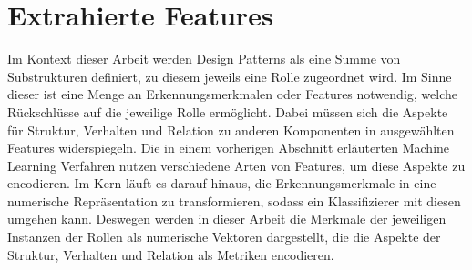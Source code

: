 \section{Extrahierte Features}

Im Kontext dieser Arbeit werden Design Patterns als eine Summe von Substrukturen definiert, zu diesem jeweils eine Rolle zugeordnet wird.
Im Sinne dieser ist eine Menge an Erkennungsmerkmalen oder Features notwendig, welche Rückschlüsse auf die jeweilige Rolle ermöglicht. 
Dabei müssen sich die Aspekte für Struktur, Verhalten und Relation zu anderen Komponenten in ausgewählten Features widerspiegeln.
Die in einem vorherigen Abschnitt erläuterten Machine Learning Verfahren nutzen verschiedene Arten von Features, um diese Aspekte zu encodieren.
Im Kern läuft es darauf hinaus, die Erkennungsmerkmale in eine numerische Repräsentation zu transformieren, sodass ein Klassifizierer mit diesen umgehen kann.
Deswegen werden in dieser Arbeit die Merkmale der jeweiligen Instanzen der Rollen als numerische Vektoren dargestellt, die die Aspekte der Struktur, Verhalten und Relation als Metriken encodieren.

